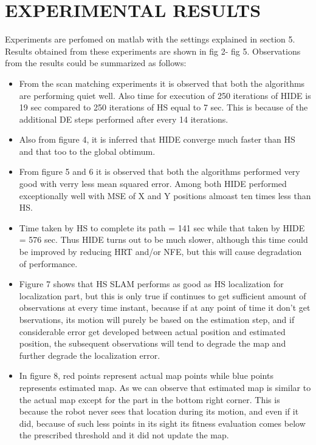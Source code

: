 \documentclass[letterpaper, 10 pt, conference]{ieeeconf}  %
\begin{document}
\section{EXPERIMENTAL RESULTS}
Experiments are perfomed on matlab with the settings explained in section 5. Results obtained from these experiments are shown in fig 2- fig 5. Observations from the results could be summarized as follows:
\begin{itemize}
\item From the scan matching experiments it is observed that both the algorithms are performing quiet well. Also time for execution of 250 iterations of HIDE is 19 sec compared to 250 iterations of HS equal to 7 sec. This is because of the additional DE steps performed after every 14 iterations.
\item Also from figure 4, it is inferred that HIDE converge much faster than HS and that too to the global obtimum. 
\item From figure 5 and 6 it is observed that both the algorithms performed very good with verry less mean squared error. Among both HIDE performed exceptionally well with MSE of X and Y positions almoast ten times less than HS.
\item Time taken by HS to complete its path = 141 sec while that taken by HIDE = 576 sec. Thus HIDE turns out to be much slower, although this time could be improved by reducing HRT and/or NFE, but this will cause degradation of performance.
\item Figure 7 shows that HS SLAM performs as good as HS localization for localization part, but this is only true if continues to get sufficient amount of observations at every time instant, because if at any point of time it don't get bservations, its motion will purely be based on the estimation step, and if considerable error get developed between actual position and estimated position, the subsequent observations will tend to degrade the map and further degrade the localization error.
\item In figure 8, red points represent actual map points while blue points represents estimated map. As we can observe that estimated map is similar to the actual map except for the part in the bottom right corner. This is because the robot never sees that location during its motion, and even if it did, because of such less points in its sight its fitness evaluation comes below the prescribed threshold and it did not update the map.
\end{itemize}
\end{document}
